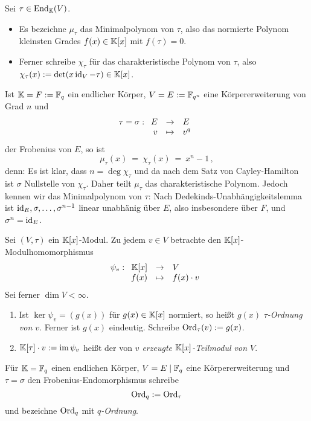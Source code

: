 \begin{notation}
  Sei $\tau\in \operatorname{End}_\mathbb{K}(V)$.
  \begin{itemize}
  \item Es bezeichne $\mu_\tau$ das Minimalpolynom von 
    $\tau$, also das normierte Polynom kleinsten Grades $f(x)\in \mathbb{K}[x]$ mit 
    $f(\tau) = 0$.
  \item Ferner schreibe $\chi_\tau$ für das charakteristische Polynom von 
    $\tau$, also $\chi_\tau(x) := \det(x \operatorname{id}_V - \tau) \in \mathbb{K}[x]$.
  \end{itemize}
\end{notation}


\begin{bemerkung}
  Ist $\mathbb{K}  = F :=\mathbb{F}_q$ ein endlicher Körper, 
  $V = E := \mathbb{F}_{q^n}$ eine Körpererweiterung
  von Grad $n$ und 
  \[\tau = \sigma: \funcdef{E & \to & E\\
    v &\mapsto & v^q}\]
  der Frobenius von $E$, so ist
  \[ \mu_\tau(x) \ =\ \chi_\tau(x) \ =\ x^n - 1\,,\]
  denn: Es ist klar, dass $n = \deg \chi_\tau$ und da nach dem Satz von
  Cayley-Hamilton ist $\sigma$ Nullstelle von $\chi_\tau$. Daher teilt
  $\mu_\tau$ das charakteristische Polynom. Jedoch kennen wir das
  Minimalpolynom von $\tau$: Nach Dedekinds-Unabhängigkeitslemma ist 
  $\operatorname{id}_E,\sigma,\ldots,\sigma^{n-1}$ linear unabhänig über $E$, also insbesondere
  über $F$, und $\sigma^n = \operatorname{id}_E$.
\end{bemerkung}


\begin{definition}
  Sei $(V,\tau)$ ein $\mathbb{K}[x]$-Modul. Zu jedem $v \in V$ betrachte den
  $\mathbb{K}[x]$-Modulhomomorphismus
  \[ \psi_v: \funcdef{\K[x] & \to & V \\
    f(x) & \mapsto & f(x)\cdot v }  \]
  Sei ferner $\dim V < \infty$.
  \begin{enumerate}
    \item Ist $\ker\psi_v = (g(x))$ für $g(x)\in \mathbb{K}[x]$ normiert, so heißt
      $g(x)$ \emph{$\tau$-Ordnung von $v$}\@. Ferner ist $g(x)$ eindeutig.
      Schreibe $\operatorname{Ord}_\tau(v) := g(x)$.
    \item $\mathbb{K}[\tau]\cdot v := \operatorname{im}{\psi_v}$ heißt der von \emph{$v$ erzeugte
      $\mathbb{K}[x]$-Teilmodul von $V$}.
  \end{enumerate}
\end{definition}


\begin{notation}
  Für $\mathbb{K} = \mathbb{F}_q$ einen endlichen Körper, $V = E \mid \mathbb{F}_q$ eine 
  Körpererweiterung und $\tau = \sigma$ den Frobenius-Endomorphismus schreibe
  \[ \operatorname{Ord}_q := \operatorname{Ord}_\tau \]
  und bezeichne $\operatorname{Ord}_q$ mit \emph{$q$-Ordnung}.
\end{notation}


